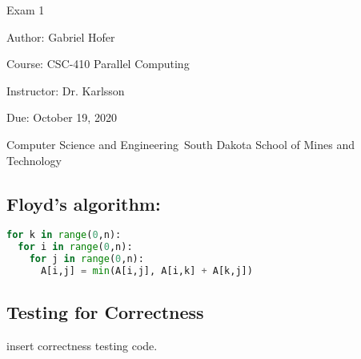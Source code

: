 \documentclass[12pt]{article}
\begin{document}
\begin{titlepage}
   \begin{center}
       \vspace*{1cm}
       \Large
       Exam 1
       \normalsize

       \vspace{0.5cm}

       Author: Gabriel Hofer

       \vspace{0.5cm}

       Course: CSC-410 Parallel Computing

       \vspace{0.5cm}

       Instructor: Dr. Karlsson
       \vspace{0.5cm}

       Due: October 19, 2020

       \vfill

       Computer Science and Engineering\
       South Dakota School of Mines and Technology\
   \end{center}
\end{titlepage}
\newpage

\subsection*{Floyd's algorithm:}



\begin{lstlisting}[frame=single,language=Python, caption=Floyd's Algorithm]
for k in range(0,n):
  for i in range(0,n):
    for j in range(0,n):
      A[i,j] = min(A[i,j], A[i,k] + A[k,j])
\end{lstlisting}

\subsection*{Testing for Correctness}

insert correctness testing code. 
\end{document}
